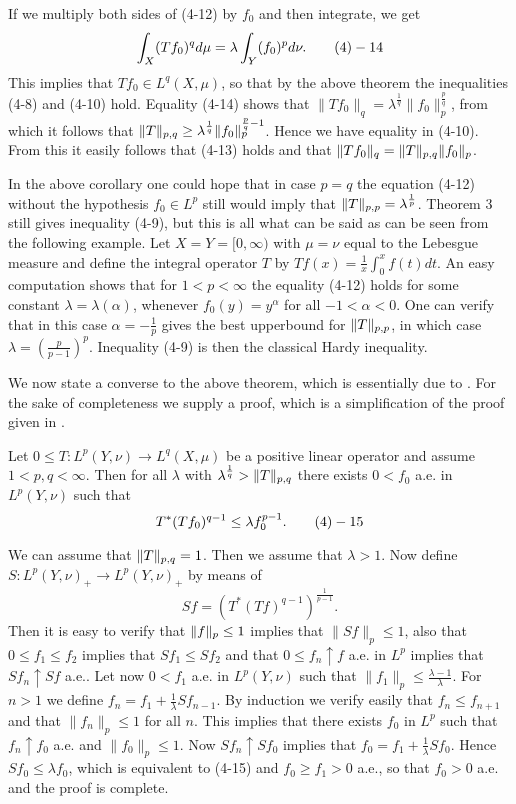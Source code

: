  If we multiply both sides of (4-12) by $f_0$ and then integrate,
we get
$$\int_X (Tf_0)^q d\mu =\lambda \int_Y (f_0)^p d\nu. \tag 4-14$$ This implies
that $Tf_0\in L^q(X,\mu)$, so that by the above theorem the inequalities (4-8)
and (4-10) hold. Equality (4-14) shows that $\| Tf_0\| _q =\lambda^{\frac 1q}
\|f_0\| _p^{\frac pq }$, from which it follows that $\| T\| _{p,q} \ge \lambda^{\frac
1q} \| f_0\|_p^{\frac pq -1} $. Hence we have equality in (4-10). From this it
easily follows that (4-13) holds and that $\| Tf_0\|_q =\| T\| _{p,q} \| f_0 \|_p$.
\enddemo


 In the above corollary one could hope that in case $p=q$ the
equation (4-12) without the hypothesis $f_0\in L^p$ still would imply that
$\| T\| _{p,p} =\lambda^{\frac 1p}$. Theorem 3 still gives inequality (4-9), but this is
all what can be said as can be seen from the following example. Let
$X=Y=[0,\infty)$ with $\mu =\nu$ equal to the Lebesgue measure and define the
integral operator $T$ by $Tf(x)=\frac 1x \int_0^x f(t)dt$. An easy
computation shows that for $1<p<\infty$ the equality (4-12) holds for some
constant $\lambda =\lambda (\alpha)$, whenever $f_0(y)= y^\alpha$ for all
$-1<\alpha < 0$. One can verify that in this case $\alpha =-\frac 1p$ gives the
best upperbound for $\| T\| _{p,p}$,  in which case $\lambda =(\frac p{p-1})^p$.
Inequality (4-9) is then the classical Hardy inequality.\enddemo

We now state a converse to the above theorem, which
is essentially due to \cite{G, Theorem 1.II}. For the sake of completeness we
supply a proof, which is a simplification of the proof given in \cite{G}.

 Let $0\le T:L^p(Y,\nu )\to L^q(X,\mu )$ be a positive
linear operator and assume $1<p,q<\infty$. Then for all $\lambda $ with
$\lambda^{\frac 1q } > \| T\| _{p,q}$ there exists $0<f_0$ a.e. in $L^p(Y,\nu )$ such
that 
$$T^*(Tf_0 )^{q-1} \le \lambda f_0^{p-1}. \tag 4-15$$
\endproclaim

 We can assume that $\| T\| _{p,q} = 1$. Then we assume that $\lambda >1$.
Now define $S:L^p(Y, \nu)_+ \to L^p(Y,\nu )_+$ by means of
$$Sf= (T^*(Tf)^{q-1})^{\frac 1{p-1}}. $$ Then it is easy to verify that $\| f\| _p
\le 1$ implies that $\| Sf \|_p \le 1$, also that $0\le f_1 \le f_2$ implies
that $Sf_1 \le Sf_2$ and that $0\le f_n \uparrow f$ a.e. in $L^p$ implies that
$Sf_n \uparrow Sf$ a.e.. Let now $0<f_1$ a.e. in $L^p(Y, \nu )$ such that $\|
f_1\|_p \le \frac {\lambda -1}\lambda$. For $n>1$ we define $f_n=f_1 +\frac
1\lambda Sf_{n-1}$. By induction we verify easily that $f_n \le f_{n+1}$ and
that $\|f_n \|_p \le 1$ for all $n$. This implies that there exists $f_0$ in
$L^p$ such that $f_n \uparrow f_0$ a.e. and $\| f_0\| _p \le 1$. Now $Sf_n
\uparrow Sf_0$ implies that $f_0=f_1+\frac 1\lambda Sf_0$. Hence $Sf_0 \le
\lambda f_0$, which is equivalent to (4-15) and $f_0 \ge f_1 > 0$ a.e., so that
$f_0 >0$ a.e. and the proof is complete. \enddemo

